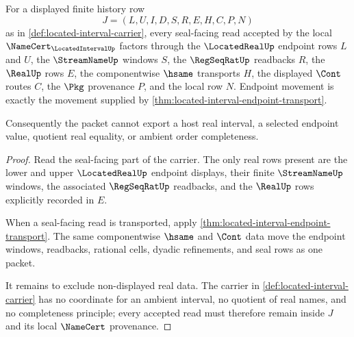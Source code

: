 \begin{theorem}
\label{thm:locatedinterval-real-seal-non-escape}
For a displayed finite history row
$$
J=(L,U,I,D,S,R,E,H,C,P,N)
$$
as in \autoref{def:located-interval-carrier}, every seal-facing read accepted by the local $\NameCert_{\LocatedIntervalUp}$ factors through the $\LocatedRealUp$ endpoint rows $L$ and $U$, the $\StreamNameUp$ windows $S$, the $\RegSeqRatUp$ readbacks $R$, the $\RealUp$ rows $E$, the componentwise $\hsame$ transports $H$, the displayed $\Cont$ routes $C$, the $\Pkg$ provenance $P$, and the local row $N$. Endpoint movement is exactly the movement supplied by \autoref{thm:located-interval-endpoint-transport}.

Consequently the packet cannot export a host real interval, a selected endpoint value, quotient real equality, or ambient order completeness.
\end{theorem}
\begin{proof}
Read the seal-facing part of the carrier. The only real rows present are the lower and upper $\LocatedRealUp$ endpoint displays, their finite $\StreamNameUp$ windows, the associated $\RegSeqRatUp$ readbacks, and the $\RealUp$ rows explicitly recorded in $E$.

When a seal-facing read is transported, apply \autoref{thm:located-interval-endpoint-transport}. The same componentwise $\hsame$ and $\Cont$ data move the endpoint windows, readbacks, rational cells, dyadic refinements, and seal rows as one packet.

It remains to exclude non-displayed real data. The carrier in \autoref{def:located-interval-carrier} has no coordinate for an ambient interval, no quotient of real names, and no completeness principle; every accepted read must therefore remain inside $J$ and its local $\NameCert$ provenance.
\end{proof}


